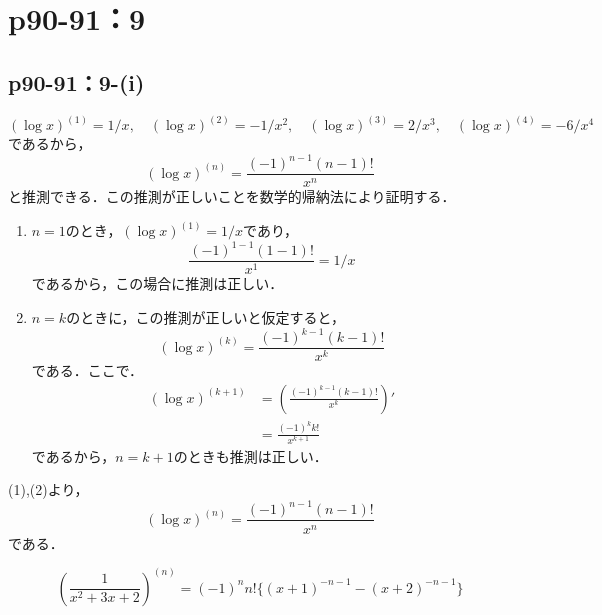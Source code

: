 \documentclass[a4paper,10pt,fleqn]{ltjsarticle}
\begin{document}


\section*{p90-91：9}

\subsection*{p90-91：9-(i)}

\begin{tleftbar}
    \[
       ( \log x )^{(1)}= 1/x , \quad (\log x)^{(2)} = - 1/x^2 , \quad (\log x)^{(3)} = 2/x^3,\quad (\log x)^{(4)} = - 6 /x^4
    \]
    であるから，
    \[
        (\log x)^{(n)} = \frac{(-1)^{n-1}  (n-1)!}{x^n}
    \]
    と推測できる．この推測が正しいことを数学的帰納法により証明する．
    \begin{enumerate}
        \item $n=1$のとき，$(\log x)^{(1)} = 1/x$であり，
        \[
            \frac{(-1)^{1-1}  (1-1)!}{x^1}=1/x
        \]
        であるから，この場合に推測は正しい．
        \item $n=k$のときに，この推測が正しいと仮定すると，
        \[
            (\log x)^{(k)} = \frac{(-1)^{k-1}  (k-1)!}{x^k}
        \]
        である．ここで．
        \begin{align*} 
            (\log x)^{(k+1)} &= \left (\frac{(-1)^{k-1}  (k-1)!}{x^k} \right ) ' \\
            & = \frac{(-1)^k  k!}{x^{k+1}}
        \end{align*} 
        であるから，$n=k+1$のときも推測は正しい．
    \end{enumerate}
    (1),(2)より，
    \[
        (\log x)^{(n)} = \frac{(-1)^{n-1}  (n-1)!}{x^n}
     \]
     である．
\end{tleftbar}

\begin{tleftbar}
    \[
      \left(   \frac{1}{x^2+3x+2} \right)^{(n)} = (-1)^n n! \{ (x+1)^{-n-1} - (x+2)^{-n-1} \} 
    \]
\end{tleftbar}
\end{document}
